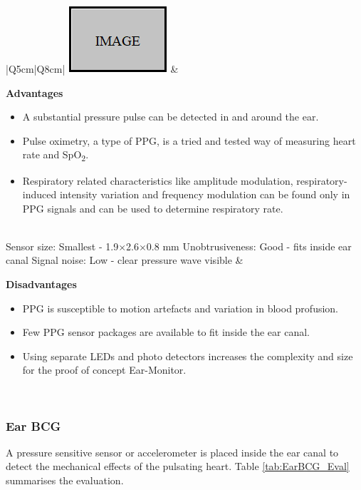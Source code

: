 \begin{table}[H]
\caption{Ear PPG}
\label{tab:EarPPG_Eval}
\renewcommand{\arraystretch}{1.3}	%
\centering
\begin{tabular}{|Q{5cm}|Q{8cm}|} 
 \hline
\includegraphics[scale=1]{figs/Image.png} 		& 	

	\textbf{Advantages}
	\begin{itemize}[leftmargin=1em, noitemsep, topsep=2pt]
	\item A substantial pressure pulse can be detected in and around the ear.
	\item Pulse oximetry, a type of PPG, is a tried and tested way of measuring heart rate and SpO\textsubscript{2}.
	\item Respiratory related characteristics like amplitude modulation, respiratory-induced intensity variation and frequency modulation can be found 	only in PPG signals and can be used to determine respiratory rate.
	\end{itemize}\\

\hline
Sensor size: Smallest - 1.9$\times$2.6$\times$0.8 mm	\newline		
Unobtrusiveness: Good - fits inside ear canal	\newline	
Signal noise: Low - clear pressure wave visible \citep{da2010ear}	&

	\textbf{Disadvantages}
	\begin{itemize}[leftmargin=1em, noitemsep, topsep=2pt]
 	\item PPG is susceptible to motion artefacts and variation in blood profusion.
 	\item Few PPG sensor packages are available to fit inside the ear canal.
  	\item Using separate LEDs and photo detectors increases the complexity  and size for the proof of concept Ear-Monitor.
  	\end{itemize}\\
 
 \hline
\end{tabular}
\end{table}

\subsubsection{Ear BCG}
A pressure sensitive sensor or accelerometer is placed inside the ear canal to detect the mechanical effects of the pulsating heart. Table \ref{tab:EarBCG_Eval} summarises the evaluation.

